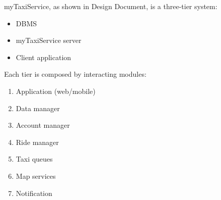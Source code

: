 myTaxiService, as shown in Design Document, is a three-tier system:
\begin{itemize}
	\item DBMS
	\item myTaxiService server
	\item Client application
\end{itemize}
Each tier is composed by interacting modules:
\begin{enumerate}
	\item Application (web/mobile)
	\item Data manager
	\item Account manager
	\item Ride manager
	\item Taxi queues
	\item Map services
	\item Notification		
\end{enumerate}
